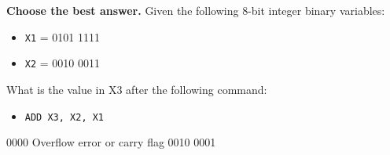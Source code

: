 \documentclass{exam}
\newcommand{\itemSpace}{24pt} %
\begin{document}
\begin{questions} %
\question \textbf{Choose the best answer.}
        Given the following 8-bit integer binary variables:
            \begin{itemize}
            \item[] {\tt{X1}} = 0101 1111
            \item[] {\tt{X2}} = 0010 0011
            \end{itemize}        
        What is the value in X3 after the following command:
            \begin{itemize}
            \item[] {\tt{ADD X3, X2, X1}}
            \end{itemize}
		\begin{choices}
			 0000
			\choice Overflow error or carry flag
			 0010
			 0001
		\end{choices}%


\end{questions}
\end{document}

